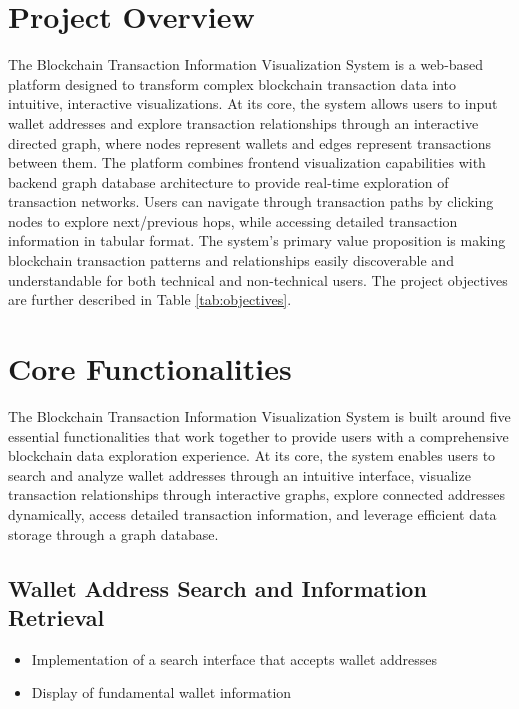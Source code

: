 \section{Project Overview}
The Blockchain Transaction Information Visualization System is a web-based platform designed to transform complex blockchain transaction data into intuitive, interactive visualizations. At its core, the system allows users to input wallet addresses and explore transaction relationships through an interactive directed graph, where nodes represent wallets and edges represent transactions between them. The platform combines frontend visualization capabilities with backend graph database architecture to provide real-time exploration of transaction networks. Users can navigate through transaction paths by clicking nodes to explore next/previous hops, while accessing detailed transaction information in tabular format. The system's primary value proposition is making blockchain transaction patterns and relationships easily discoverable and understandable for both technical and non-technical users. The project objectives are further described in Table \ref{tab:objectives}.

\section{Core Functionalities}
The Blockchain Transaction Information Visualization System is built around five essential functionalities that work together to provide users with a comprehensive blockchain data exploration experience. At its core, the system enables users to search and analyze wallet addresses through an intuitive interface, visualize transaction relationships through interactive graphs, explore connected addresses dynamically, access detailed transaction information, and leverage efficient data storage through a graph database. 

\subsection{Wallet Address Search and Information Retrieval}
\begin{itemize}
    \item Implementation of a search interface that accepts wallet addresses
    \item Display of fundamental wallet information    
\end{itemize}

